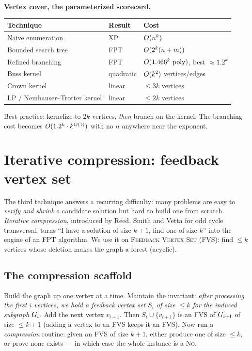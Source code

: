\begin{complexitybox}
\textbf{Vertex cover, the parameterized scorecard.}
\begin{center}
\begin{tabular}{lll}
\toprule
Technique & Result & Cost \\
\midrule
Naive enumeration & XP & $O(n^k)$ \\
Bounded search tree & FPT & $O(2^k(n+m))$ \\
Refined branching & FPT & $O(1.466^k\,\operatorname{poly})$, best $\approx 1.2^k$ \\
Buss kernel & quadratic & $O(k^2)$ vertices/edges \\
Crown kernel & linear & $\le 3k$ vertices \\
LP / Nemhauser--Trotter kernel & linear & $\le 2k$ vertices \\
\bottomrule
\end{tabular}
\end{center}
Best practice: kernelize to $2k$ vertices, \emph{then} branch on the kernel. The branching cost becomes $O(1.2^k\cdot k^{O(1)})$ with no $n$ anywhere near the exponent.
\end{complexitybox}

\section{Iterative compression: feedback vertex set}

The third technique answers a recurring difficulty: many problems are easy to \emph{verify and shrink} a candidate solution but hard to build one from scratch. \emph{Iterative compression}, introduced by Reed, Smith and Vetta for odd cycle transversal, turns ``I have a solution of size $k+1$, find one of size $k$'' into the engine of an FPT algorithm. We use it on \textsc{Feedback Vertex Set} (FVS): find $\le k$ vertices whose deletion makes the graph a forest (acyclic).

\subsection{The compression scaffold}

Build the graph up one vertex at a time. Maintain the invariant: \emph{after processing the first $i$ vertices, we hold a feedback vertex set $S_i$ of size $\le k$ for the induced subgraph $G_i$}. Add the next vertex $v_{i+1}$. Then $S_i\cup\{v_{i+1}\}$ is an FVS of $G_{i+1}$ of size $\le k+1$ (adding a vertex to an FVS keeps it an FVS). Now run a \emph{compression} routine: given an FVS of size $k+1$, either produce one of size $\le k$, or prove none exists --- in which case the whole instance is a \textsc{No}.

